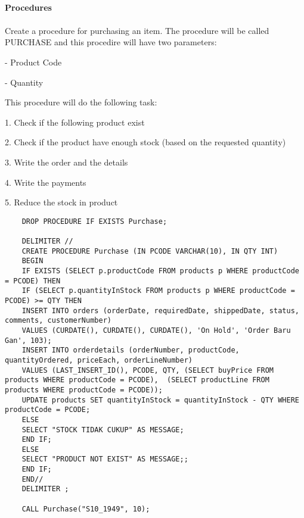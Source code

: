 \documentclass{article}
\begin{document}
	\paragraph{Procedures}
	\paragraph{}
	Create a procedure for purchasing an item. The procedure will be called PURCHASE and this procedire will have two parameters:
	
	-	Product Code
	
	-	Quantity
	
	This procedure will do the following task:

	1.	Check if the following product exist 
	
	2.	Check if the product have enough stock (based on the requested  quantity)
	
	3.	Write the order and the details
	
	4.	Write the payments
	
	5.	Reduce the stock in product
	
	\begin{verbatim}
	DROP PROCEDURE IF EXISTS Purchase;
	
	DELIMITER // 
	CREATE PROCEDURE Purchase (IN PCODE VARCHAR(10), IN QTY INT) 
	BEGIN
	IF EXISTS (SELECT p.productCode FROM products p WHERE productCode = PCODE) THEN
	IF (SELECT p.quantityInStock FROM products p WHERE productCode = PCODE) >= QTY THEN
	INSERT INTO orders (orderDate, requiredDate, shippedDate, status, comments, customerNumber)
	VALUES (CURDATE(), CURDATE(), CURDATE(), 'On Hold', 'Order Baru Gan', 103);
	INSERT INTO orderdetails (orderNumber, productCode, quantityOrdered, priceEach, orderLineNumber)
	VALUES (LAST_INSERT_ID(), PCODE, QTY, (SELECT buyPrice FROM products WHERE productCode = PCODE),  (SELECT productLine FROM products WHERE productCode = PCODE));
	UPDATE products SET quantityInStock = quantityInStock - QTY WHERE productCode = PCODE;
	ELSE
	SELECT "STOCK TIDAK CUKUP" AS MESSAGE;
	END IF;
	ELSE
	SELECT "PRODUCT NOT EXIST" AS MESSAGE;;
	END IF;
	END//
	DELIMITER ;
	
	CALL Purchase("S10_1949", 10);
	\end{verbatim}
\end{document}
